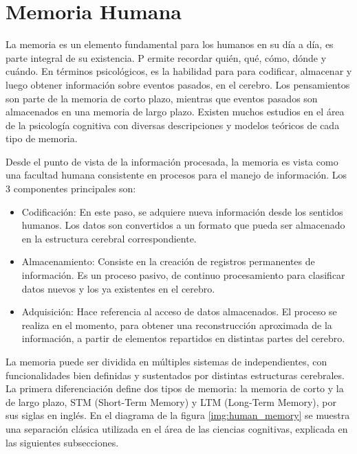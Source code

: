 \section{Memoria Humana}



La memoria es un elemento fundamental para los humanos en su d\'ia a d\'ia, es parte integral de su existencia. P ermite recordar qui\'en, qu\'e, c\'omo, d\'onde y cu\'ando. En t\'erminos psicol\'ogicos, es la habilidad para para codificar, almacenar y luego obtener informaci\'on sobre eventos pasados, en el cerebro. Los pensamientos son parte de la memoria de corto plazo, mientras que eventos pasados son almacenados en una memoria de largo plazo. Existen muchos estudios en el \'area de la psicolog\'ia cognitiva con diversas descripciones y modelos te\'oricos de cada tipo de memoria\cite{Vijayakumar2014}.

Desde el punto de vista de la informaci\'on procesada, la memoria es vista como una facultad humana consistente en procesos para el manejo de informaci\'on. Los 3 componentes principales son:

\begin{itemize}
\item Codificaci\'on: En este paso, se adquiere nueva informaci\'on desde los sentidos humanos. Los datos son convertidos a un formato que pueda ser almacenado en la estructura cerebral correspondiente.
\item Almacenamiento: Consiste en la creaci\'on de registros permanentes de informaci\'on. Es un proceso pasivo, de continuo procesamiento para clasificar datos nuevos y los ya existentes en el cerebro.
\item Adquisici\'on: Hace referencia al acceso de datos almacenados. El proceso se realiza en el momento, para obtener una reconstrucci\'on aproximada de la informaci\'on, a partir de elementos repartidos en distintas partes del cerebro.
\end{itemize}


La memoria puede ser dividida en m\'ultiples sistemas de independientes, con funcionalidades bien definidas y sustentados por distintas estructuras cerebrales. La primera diferenciaci\'on define dos tipos de memoria: la memoria de corto y la de largo plazo, STM (Short-Term Memory) y LTM (Long-Term Memory), por sus siglas en ingl\'es. En el diagrama de la figura \ref{img:human_memory} se muestra una separaci\'on cl\'asica utilizada en el \'area de las ciencias cognitivas\cite{Eichenbaum:2008}, explicada en las siguientes subsecciones.

